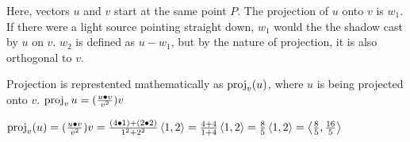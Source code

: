 \documentclass{report}
\begin{document}
Here, vectors $u$ and $v$ start at the same point $P$. The projection of $u$ onto $v$ is $w_1$. If there were a light source pointing straight down, $w_1$ would the the shadow cast by $u$ on $v$. $w_2$ is defined as $u-w_1$, but by the nature of projection, it is also orthogonal to $v$.

Projection is represtented mathematically as $\operatorname{proj}_v(u)$, where $u$ is being projected onto $v$. $\operatorname{proj}_vu=(\frac{u \bullet v}{v^2})v$


\sol $\operatorname{proj}_v(u)=(\frac{u \bullet v}{v^2})v=\frac{(4 \bullet 1)+(2 \bullet 2)}{1^2+2^2}\left\langle 1,2 \right\rangle=\frac{4+4}{1+4}\left\langle 1,2 \right\rangle=\frac{8}{5}\left\langle 1,2 \right\rangle=\left\langle \frac{8}{5},\frac{16}{5} \right\rangle$
\begin{center}
\end{center}
\end{document}
